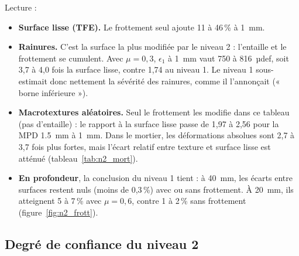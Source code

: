 Lecture :
\begin{itemize}[nosep]
\item \textbf{Surface lisse (TFE).} Le frottement seul ajoute 11 à
      46\,\% à \SI{1}{mm}.
\item \textbf{Rainures.} C'est la surface la plus modifiée par le niveau 2 : l'entaille et le
      frottement se cumulent. Avec $\mu=0{,}3$, $\epsilon_1$ à \SI{1}{mm} vaut 750 à 816~µdef,
      soit 3,7 à 4,0 fois la
      surface lisse, contre 1,74 au niveau 1.
      Le niveau 1 sous-estimait donc nettement la sévérité des rainures, comme il l'annonçait
      (« borne inférieure »).
\item \textbf{Macrotextures aléatoires.} Seul le frottement les modifie dans ce tableau (pas
      d'entaille) : le rapport à la surface lisse passe de 1,97 à
      2,56 pour la MPD \SI{1.5}{mm} à \SI{1}{mm}. Dans le
      mortier, les déformations absolues sont 2,7 à 3,7 fois
      plus fortes, mais l'écart relatif entre texture et surface lisse est atténué
      (tableau~\ref{tab:n2_mort}).
\item \textbf{En profondeur}, la conclusion du niveau 1 tient : à \SI{40}{mm}, les écarts entre
      surfaces restent nuls (moins de 0,3\,\%) avec ou sans frottement. À \SI{20}{mm}, ils
      atteignent 5 à 7\,\% avec $\mu=0{,}6$, contre 1 à 2\,\% sans frottement
      (figure~\ref{fig:n2_frott}).
\end{itemize}

\subsection{Degré de confiance du niveau 2}\label{sec:n2_confiance}

